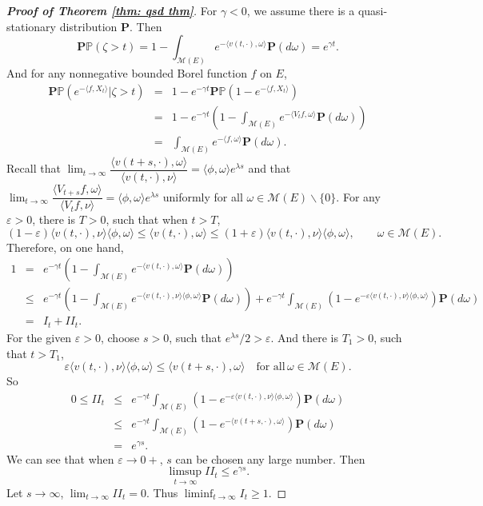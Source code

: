 \documentclass[12pt,a4paper]{amsart}
\theoremstyle{plain}
\theoremstyle{definition}
\numberwithin{equation}{section}
\begin{document}
\begin{proof}[{\bf Proof of Theorem \ref{thm: qsd thm}}]
  For $\gamma<0$, we assume there is a quasi-stationary distribution $\mathbf P$.  Then
\[
\mathbf P\mathbb P(\zeta>t)=1-\int_{\mathcal M(E)}e^{-\langle v(t,\cdot),\omega\rangle }\mathbf P(d\omega)=e^{\gamma t}.
\]
And for any nonnegative bounded Borel function $f$ on $E$,
\begin{eqnarray*}
\mathbf P\mathbb P\left(e^{-\langle f, X_t\rangle }\big|\zeta>t\right)&=&1-e^{-\gamma t}\mathbf P\mathbb P\left(1-e^{-\langle f, X_t\rangle }\right)\\
&=&1-e^{-\gamma t}\left(1-\int_{\mathcal M(E)}e^{-\langle V_tf,\omega\rangle }\mathbf P(d\omega)\right)\\
&=&\int_{\mathcal M(E)}e^{-\langle f,\omega\rangle }\mathbf P(d\omega).
\end{eqnarray*}
Recall that $\lim_{t\rightarrow\infty}\dfrac{\langle v(t+s,\cdot),\omega\rangle }{\langle v(t,\cdot),\nu\rangle }=\langle \phi,\omega\rangle e^{\lambda s} $ and that $\lim_{t\rightarrow\infty}\dfrac{\langle V_{t+s}f,\omega\rangle }{\langle V_tf,\nu\rangle }=\langle \phi,\omega\rangle e^{\lambda s}$ uniformly for all $\omega\in \mathcal M(E)\backslash\{0\}$.  For any $\varepsilon>0$, there is $T>0$, such that when $t>T$,
\[
(1-\varepsilon)\langle v(t,\cdot),\nu\rangle \langle \phi,\omega\rangle\leq \langle v(t,\cdot),\omega\rangle\leq (1+\varepsilon)\langle v(t,\cdot),\nu\rangle \langle \phi,\omega\rangle,\qquad \omega\in\mathcal M(E).
\]
Therefore, on one hand,
\begin{eqnarray*}
1&=&e^{-\gamma t}\left(1-\int_{\mathcal M(E)}e^{-\langle v(t,\cdot),\omega\rangle }\mathbf P(d\omega)\right)\\
&\leq &e^{-\gamma t}\left(1-\int_{\mathcal M(E)}e^{-\langle v(t,\cdot),\nu\rangle\langle\phi,\omega\rangle }\mathbf P(d\omega)\right)+e^{-\gamma t}\int_{\mathcal M(E)}\left(1-e^{-\varepsilon\langle v(t,\cdot),\nu\rangle\langle\phi,\omega\rangle  }\right)\mathbf P(d\omega)\\
&=&I_t+II_t.
\end{eqnarray*}
For the given $\varepsilon>0$, choose $s>0$, such that $e^{\lambda s}/2>\varepsilon$.  And there is $T_1>0$, such that $t>T_1$,
\[
\varepsilon\langle v(t,\cdot),\nu\rangle\langle\phi,\omega\rangle\leq \langle v(t+s,\cdot),\omega\rangle \quad\mbox{for all}\, \omega\in\mathcal M(E).
\]
So
\begin{eqnarray*}
0\leq II_t&\leq& e^{-\gamma t}\int_{\mathcal M(E)}\left(1-e^{-\varepsilon\langle v(t,\cdot),\nu\rangle\langle\phi,\omega\rangle  }\right)\mathbf P(d\omega)\\
&\leq& e^{-\gamma t}\int_{\mathcal M(E)}\left(1-e^{-\langle v(t+s,\cdot),\omega\rangle  }\right)\mathbf P(d\omega)\\
&=&e^{\gamma s}.
\end{eqnarray*}
We can see that when $\varepsilon\to0+$, $s$ can be chosen any large number.  Then
\[
\limsup_{t\to\infty}II_t\leq e^{\gamma s}.
\]
Let $s\to\infty$, $\lim_{t\to\infty}II_t=0$. Thus $\liminf_{t\to\infty}I_t\geq 1$.


\end{proof}
\end{document}
